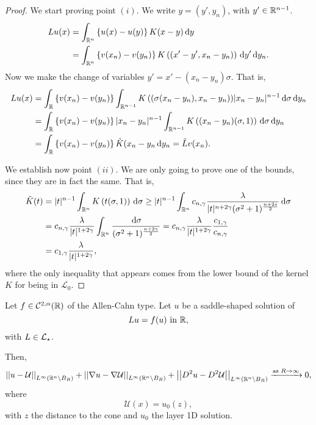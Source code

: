 \begin{proof}
	
	We start proving point $(i)$. We write $y=(y',y_n)$, with $y'\in \mathbb{R}^{n-1}$.
	\begin{align*}
	Lu(x) &= \int_{\mathbb{R}^n} \left\{ u(x)-u(y) \right\} K(x-y) \,\mathrm{d} y \\
	&=\int_{\mathbb{R}^n} \left\{ v(x_n)-v(y_n) \right\} K\left((x'-y',x_n-y_n)\right) \,\mathrm{d} y' \,\mathrm{d} y_n.
	\end{align*}
	Now we make the change of variables $y' = x'-(x_n-y_n)\sigma$. That is,
	\begin{align*}
	Lu(x) &= \int_{\mathbb{R}} \left\{ v(x_n)-v(y_n) \right\} \int_{\mathbb{R}^{n-1}} K\left((\sigma(x_n-y_n),x_n-y_n\right)) |x_n-y_n|^{n-1} \,\mathrm{d} \sigma \,\mathrm{d} y_n \\
	&= \int_{\mathbb{R}} \left\{ v(x_n)-v(y_n) \right\} |x_n-y_n|^{n-1} \int_{\mathbb{R}^{n-1}} K\left((x_n-y_n)(\sigma,1)\right) \,\mathrm{d}\sigma \,\mathrm{d} y_n \\
	&= \int_{\mathbb{R}} \left\{ v(x_n)-v(y_n) \right\} \tilde{K}(x_n-y_n \,\mathrm{d} y_n = \tilde{L}v(x_n). \\
	\end{align*}
	
	We establish now point $(ii)$. We are only going to prove one of the bounds, since they are in fact the same. That is,
	\begin{align*}
	\tilde{K}(t) &= |t|^{n-1} \int_{\mathbb{R}^n} K\left(t(\sigma,1)\right) \,\mathrm{d}\sigma \geq |t|^{n-1} \int_{\mathbb{R}^n} c_{n,\gamma} \frac{\lambda}{|t|^{n+2\gamma}(\sigma^2+1)^{\frac{n+2s}{2}}} \,\mathrm{d}\sigma \\
	&= c_{n,\gamma} \frac{\lambda}{|t|^{1+2\gamma}} \int_{\mathbb{R}^n} \frac{\,\mathrm{d}\sigma}{(\sigma^2+1)^{\frac{n+2\gamma}{2}}} = c_{n,\gamma} \frac{\lambda}{|t|^{1+2\gamma}} \frac{c_{1,\gamma}}{c_{n,\gamma}} \\
	&= c_{1,\gamma} \frac{\lambda}{|t|^{1+2\gamma}},
	\end{align*}
	where the only inequality that appears comes from the lower bound of the kernel $K$ for being in $\mathcal{L}_0$.
\end{proof}







\begin{theorem}
\label{Thm:AsymptoticBehaviourSaddleSolution}
Let $f\in \mathcal{C}^{2,\alpha}(\mathbb{R})$ of the Allen-Cahn type. Let $u$ be a saddle-shaped solution of
$$
Lu = f(u) \ \textrm{in } \R,
$$
with $L\in \mathcal{L}_\star$.

Then,
$$
\left | \left |{u-\mathcal{U}} \right | \right |_{L^\infty(\mathbb{R}^n\setminus B_R)}+\left | \left |{\nabla u-\nabla \mathcal{U}} \right | \right |_{L^\infty(\mathbb{R}^n\setminus B_R)}+\left | \left |{D^2u-D^2\mathcal{U}} \right | \right |_{L^\infty(\mathbb{R}^n\setminus B_R)} \xrightarrow{\text{as } R\to \infty}{} 0,
$$
where
$$
\mathcal{U}(x) = u_0(z),
$$
with $z$ the distance to the cone and $u_0$ the layer 1D solution.
\end{theorem}


